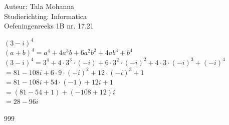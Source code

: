 \documentclass[a4paper]{article}
\begin{document}
\noindent \large Auteur: Tala Mohanna \\
\noindent \large Studierichting: Informatica\\
\noindent \large Oefeningenreeks 1B nr. 17.21\\

\medskip

\normalsize


$(3 - i)^4$ \\

$(a+b)^4 = a^4 + 4a^3b + 6a^2b^2 + 4ab^3 + b^4$\\

$(3-i)^4 = 3^4 + 4 \cdot 3^3 \cdot (-i) + 6 \cdot 3^2 \cdot (-i)^2 + 4 \cdot 3 \cdot (-i)^3 + (-i)^4$\\

$ = 81 - 108i + 6 \cdot 9 \cdot (-i)^2 + 12 \cdot (-i)^3 + 1$ \\

$ = 81 - 108i + 54 \cdot (-1) + 12i + 1 $\\

$ = (81 - 54 + 1) + (-108 + 12)i $\\

$ = 28 - 96i$\\

\begin{thebibliography}{999}
\end{thebibliography}
\end{document}
